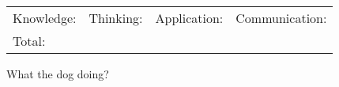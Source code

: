 \documentclass[12pt,a4paper,addpoints]{exam}
\begin{document}
\begin{tabularx}{\textwidth}{@{}XXXX@{}}
    Knowledge: & Thinking: & Application: & Communication:\\ Total:
\end{tabularx}
\vspace{1em}

\begin{questions}
    \question[10] What the dog doing?
\end{questions}
\end{document}
